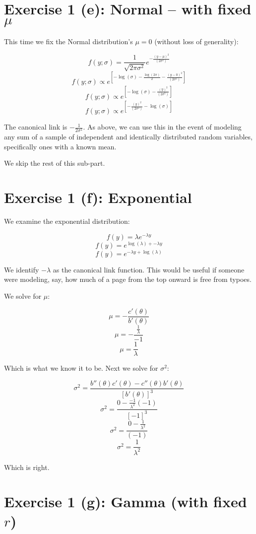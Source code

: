 \documentclass[12pt,a4paper]{article}
\begin{document}
\newpage
\section{Exercise 1 (e): Normal -- with fixed $\mu$}

This time we fix the Normal distribution's $\mu = 0$ (without loss of generality): 

$$f(y;\sigma) = \frac{1}{\sqrt{2 \pi \sigma^{2}}} e^{- \frac{(y-\mu)^{2}}{(2\sigma^{2})}}$$
$$f(y;\sigma) \propto e^{[-\log(\sigma) - \frac{\log(2\pi)}{2} - \frac{(y-0)^{2}}{(2\sigma^{2})}]}$$
$$f(y;\sigma) \propto e^{[-\log(\sigma) - \frac{(y)^{2}}{(2\sigma^{2})}]}$$
$$f(y;\sigma) \propto e^{[- \frac{(y)^{2}}{(2\sigma^{2})} -\log(\sigma)]}$$

The canonical link is $-\frac{1}{2\sigma^{2}}$. As above, we can use this in the event of modeling any sum of a sample of independent and identically distributed random variables, specifically ones with a known mean. 

We skip the rest of this sub-part.

\newpage
\section{Exercise 1 (f): Exponential}

We examine the exponential distribution: 

$$f(y) = \lambda e^{-\lambda y}$$
$$f(y) = e^{\log(\lambda) + -\lambda y}$$
$$f(y) = e^{-\lambda y + \log(\lambda)}$$

We identify $-\lambda$ as the canonical link function. This would be useful if someone were modeling, say, how much of a page from the top onward is free from typoes.

\newpage

We solve for $\mu$: 

$$\mu = - \frac{c'(\theta)}{b'(\theta)}$$
$$\mu = - \frac{\frac{1}{\lambda}}{-1}$$
$$\mu = \frac{1}{\lambda}$$

Which is what we know it to be. Next we solve for $\sigma^{2}$: 

$$\sigma^{2} = \frac{b''(\theta)c'(\theta) - c''(\theta)b'(\theta)}{[b'(\theta)]^{3}}$$
$$\sigma^{2} = \frac{0 - \frac{-1}{\lambda^{2}}(-1)}{[-1]^{3}}$$
$$\sigma^{2} = \frac{0 - \frac{1}{\lambda^{2}}}{(-1)}$$
$$\sigma^{2} = \frac{1}{\lambda^{2}}$$

Which is right. 

\newpage
\section{Exercise 1 (g): Gamma (with fixed $r$)}
\end{document}
